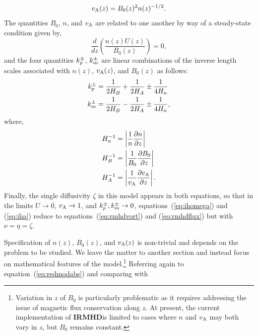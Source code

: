 \documentclass[12pt, letterpaper, oneside, leqno, openright]{memoir}
\newcommand{\irmhd}{\textbf{IRMHD}}
\begin{document}
%
\begin{equation}
  v_{\mathrm{A}}(z)=B_0(z)^2n(z)^{-1/2}.
\end{equation}
%
The quantities $B_0$, $n$, and $v_{\mathrm{A}}$ are related to one
another by way of a steady-state condition given by, \citep{Whang80}
%
\begin{equation}
  \frac{d}{dz}\left(\frac{n(z)U(z)}{B_0(z)}\right) = 0 \label{eq:consflux},
\end{equation}
%
and the four quantities $k_p^\pm$, $k_m^\pm$ are linear combinations of 
the inverse length scales associated with $n(z)$, $v_{\mathrm{A}}(z)$, and
$B_0(z)$ as follows:
%
\begin{subequations}
\begin{align}
  k_p^\pm &=\frac{1}{2H_B} + \frac{1}{2H_A} \pm \frac{1}{4H_n} \label{eq:kppmdef} \\
  k_m^\pm &=\frac{1}{2H_B} - \frac{1}{2H_A} \pm \frac{1}{4H_n} \label{eq:kmpmdef},
\end{align}
\end{subequations}
%
where,
%
\begin{subequations}
\begin{align}
  H_n^{-1} &= \left|\frac{1}{n}\frac{\partial n}{\partial z}\right|                     \label{eq:defhr} \\
  H_B^{-1} &= \left|\frac{1}{B_0}\frac{\partial B_0}{\partial z}\right|                 \label{eq:defhb} \\
  H_A^{-1} &= \left|\frac{1}{v_{\mathrm{A}}}\frac{\partial v_{\mathrm{A}}}{\partial z}\right|. \label{eq:defha}
\end{align}
\end{subequations}
%
Finally, the single diffusivity $\zeta$ in this model appears in both
equations, so that in the limits $U\rightarrow 0$, $v_{\mathrm{A}}\rightarrow 1$,
and $k_p^\pm,k_m^\pm\rightarrow 0$, equations~(\ref{eq:ihomega}) and
(\ref{eq:iha}) reduce to equations~(\ref{eq:rmhdvort}) and (\ref{eq:rmhdflux})
but with $\nu=\eta=\zeta$.
%
\par
%
Specification of $n(z)$, $B_0(z)$, and $v_{\mathrm{A}}(z)$ is non-trivial
and depends on the problem to be studied. We leave the matter to another
section and instead focus on mathematical features of the 
model.\footnote{Variation in $z$ of $B_0$ is particularly problematic as
it requires addressing the issue of magnetic flux conservation along $z$.
At present, the current implementation of \irmhd is limited to cases where
$n$ and $v_{\mathrm{A}}$ may both vary in $z$, but $B_0$ remains constant.}
Referring again to equation~(\ref{eq:redmodabs}) and comparing with
\end{document}
